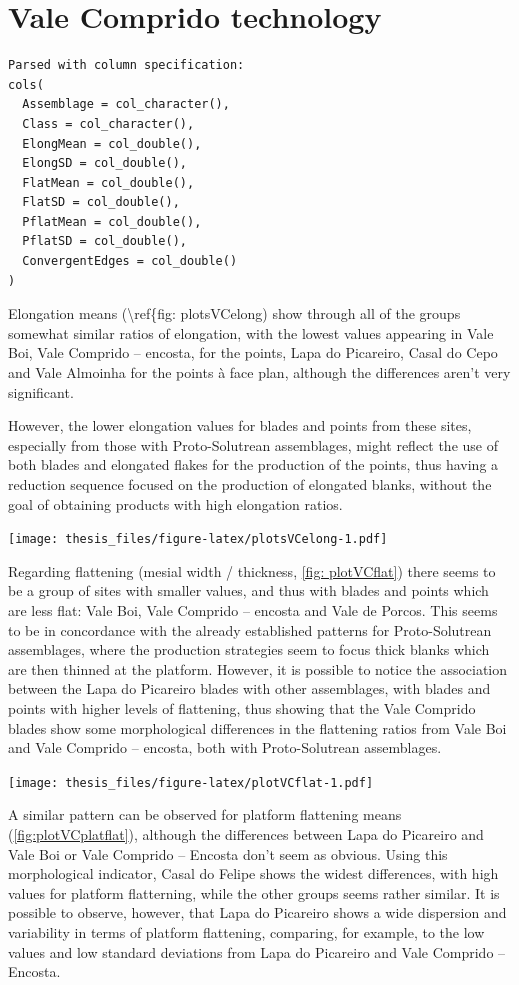 \documentclass[12pt,twoside]{reedthesis}
\begin{document}
\hypertarget{vale-comprido-technology-1}{%
\section{Vale Comprido technology}\label{vale-comprido-technology-1}}
\begin{verbatim}
Parsed with column specification:
cols(
  Assemblage = col_character(),
  Class = col_character(),
  ElongMean = col_double(),
  ElongSD = col_double(),
  FlatMean = col_double(),
  FlatSD = col_double(),
  PflatMean = col_double(),
  PflatSD = col_double(),
  ConvergentEdges = col_double()
)
\end{verbatim}
Elongation means (\textbackslash ref\{fig: plotsVCelong) show through all of the groups somewhat similar ratios of elongation, with the lowest values appearing in Vale Boi, Vale Comprido -- encosta, for the points, Lapa do Picareiro, Casal do Cepo and Vale Almoinha for the points à face plan, although the differences aren't very significant.

However, the lower elongation values for blades and points from these sites, especially from those with Proto-Solutrean assemblages, might reflect the use of both blades and elongated flakes for the production of the points, thus having a reduction sequence focused on the production of elongated blanks, without the goal of obtaining products with high elongation ratios.

\texttt{[image: thesis\_files/figure-latex/plotsVCelong-1.pdf]}

Regarding flattening (mesial width / thickness, \ref{fig: plotVCflat}) there seems to be a group of sites with smaller values, and thus with blades and points which are less flat: Vale Boi, Vale Comprido -- encosta and Vale de Porcos. This seems to be in concordance with the already established patterns for Proto-Solutrean assemblages, where the production strategies seem to focus thick blanks which are then thinned at the platform. However, it is possible to notice the association between the Lapa do Picareiro blades with other assemblages, with blades and points with higher levels of flattening, thus showing that the Vale Comprido blades show some morphological differences in the flattening ratios from Vale Boi and Vale Comprido -- encosta, both with Proto-Solutrean assemblages.

\texttt{[image: thesis\_files/figure-latex/plotVCflat-1.pdf]}

A similar pattern can be observed for platform flattening means (\ref{fig:plotVCplatflat}), although the differences between Lapa do Picareiro and Vale Boi or Vale Comprido -- Encosta don't seem as obvious. Using this morphological indicator, Casal do Felipe shows the widest differences, with high values for platform flatterning, while the other groups seems rather similar. It is possible to observe, however, that Lapa do Picareiro shows a wide dispersion and variability in terms of platform flattening, comparing, for example, to the low values and low standard deviations from Lapa do Picareiro and Vale Comprido -- Encosta.
\end{document}
